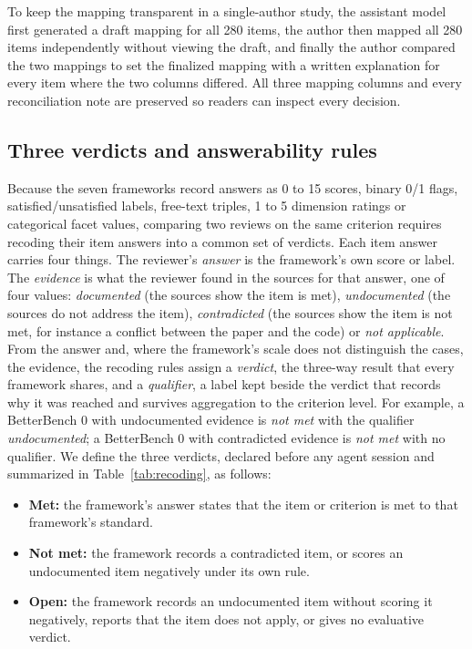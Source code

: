 \documentclass[10pt,conference]{IEEEtran}
\begin{document}
To keep the mapping transparent in a single-author study, the assistant model first generated a draft mapping for all 280 items, the author then mapped all 280 items independently without viewing the draft, and finally the author compared the two mappings to set the finalized mapping with a written explanation for every item where the two columns differed. All three mapping columns and every reconciliation note are preserved so readers can inspect every decision.

\subsection{Three verdicts and answerability rules}
\label{sec:recoding}
Because the seven frameworks record answers as 0 to 15 scores, binary 0/1 flags, satisfied/unsatisfied labels, free-text triples, 1 to 5 dimension ratings or categorical facet values, comparing two reviews on the same criterion requires recoding their item answers into a common set of verdicts. Each item answer carries four things. The reviewer's \emph{answer} is the framework's own score or label. The \emph{evidence} is what the reviewer found in the sources for that answer, one of four values: \emph{documented} (the sources show the item is met), \emph{undocumented} (the sources do not address the item), \emph{contradicted} (the sources show the item is not met, for instance a conflict between the paper and the code) or \emph{not applicable}. From the answer and, where the framework's scale does not distinguish the cases, the evidence, the recoding rules assign a \emph{verdict}, the three-way result that every framework shares, and a \emph{qualifier}, a label kept beside the verdict that records why it was reached and survives aggregation to the criterion level. For example, a BetterBench 0 with undocumented evidence is \emph{not met} with the qualifier \emph{undocumented}; a BetterBench 0 with contradicted evidence is \emph{not met} with no qualifier. We define the three verdicts, declared before any agent session and summarized in Table~\ref{tab:recoding}, as follows:
\begin{itemize}
\item \textbf{Met:} the framework's answer states that the item or criterion is met to that framework's standard.
\item \textbf{Not met:} the framework records a contradicted item, or scores an undocumented item negatively under its own rule.
\item \textbf{Open:} the framework records an undocumented item without scoring it negatively, reports that the item does not apply, or gives no evaluative verdict.
\end{itemize}
\end{document}
